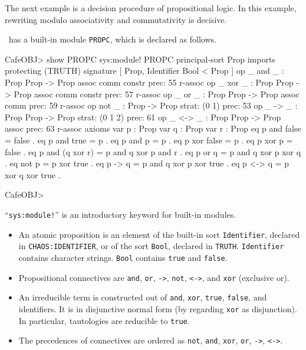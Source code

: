 \documentclass[a4paper]{memoir}
\begin{document}
The next example is a decision procedure of propositional logic.
In this example, rewriting modulo associativity and commutativity
is decisive.

\cafeobj~has a built-in module \verb|PROPC|, which is declared as follows.
\label{exs:propc}
\begin{vvtm}
\begin{ccode}
  CafeOBJ> show PROPC
  sys:module! PROPC
        principal-sort Prop
 {
    imports {
      protecting (TRUTH)
    }
    signature {
      [ Prop, Identifier Bool < Prop ]
      op _ and _ : Prop Prop -> Prop { assoc comm constr prec: 55 r-assoc }
      op _ xor _ : Prop Prop -> Prop { assoc comm constr prec: 57 r-assoc }
      op _ or _ : Prop Prop -> Prop { assoc comm prec: 59 r-assoc }
      op not _ : Prop -> Prop { strat: (0 1) prec: 53 }
      op _ -> _ : Prop Prop -> Prop { strat: (0 1 2) prec: 61 }
      op _ <-> _ : Prop Prop -> Prop { assoc prec: 63 r-assoc }
    }
    axioms {
      var p : Prop
      var q : Prop
      var r : Prop
      eq p and false = false .
      eq p and true = p .
      eq p and p = p .
      eq p xor false = p .
      eq p xor p = false .
      eq p and (q xor r) = p and q xor p and r .
      eq p or q = p and q xor p xor q .
      eq not p = p xor true .
      eq p -> q = p and q xor p xor true .
      eq p <-> q = p xor q xor true .
    }
  }

  CafeOBJ>
\end{ccode}
\end{vvtm}
``\verb|sys:module!|'' is an introductory keyword for built-in modules.
\begin{itemize}
\item An atomic proposition is an element of the built-in
  sort \verb|Identifier|, declared in \newline
  \verb|CHAOS:IDENTIFIER|, or of the sort \verb|Bool|,
  declared in \verb|TRUTH|.
  \verb|Identifier| contains character strings.
  \verb|Bool| contains \verb|true| and \verb|false|.
\item Propositional connectives are \texttt{and}, \texttt{or}, \texttt{->},
  \texttt{not}, \texttt{<->}, and \texttt{xor} (exclusive or).
\item An irreducible term is constructed out of \texttt{and}, \texttt{xor},
  \texttt{true}, \texttt{false}, and identifiers.
  It is in disjunctive normal form (by regarding \texttt{xor} as disjunction).
  In particular, tautologies are reducible to \texttt{true}.
\item The precedences of connectives are ordered as
  \texttt{not}, \texttt{and}, \texttt{xor}, \texttt{or}, \texttt{->}, \texttt{<->}.
\end{itemize}
\end{document}

